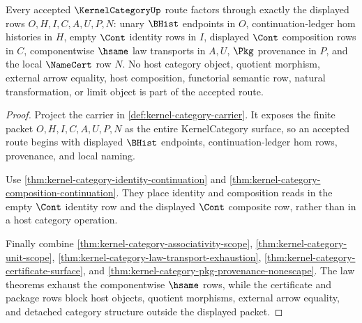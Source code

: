 \begin{theorem}
\label{thm:kernel-category-route-totality}
Every accepted $\KernelCategoryUp$ route factors through exactly the displayed rows $O,H,I,C,A,U,P,N$: unary $\BHist$ endpoints in $O$, continuation-ledger hom histories in $H$, empty $\Cont$ identity rows in $I$, displayed $\Cont$ composition rows in $C$, componentwise $\hsame$ law transports in $A,U$, $\Pkg$ provenance in $P$, and the local $\NameCert$ row $N$. No host category object, quotient morphism, external arrow equality, host composition, functorial semantic row, natural transformation, or limit object is part of the accepted route.
\end{theorem}
\begin{proof}
Project the carrier in \autoref{def:kernel-category-carrier}. It exposes the finite packet $O,H,I,C,A,U,P,N$ as the entire KernelCategory surface, so an accepted route begins with displayed $\BHist$ endpoints, continuation-ledger hom rows, provenance, and local naming.

Use \autoref{thm:kernel-category-identity-continuation} and \autoref{thm:kernel-category-composition-continuation}. They place identity and composition reads in the empty $\Cont$ identity row and the displayed $\Cont$ composite row, rather than in a host category operation.

Finally combine \autoref{thm:kernel-category-associativity-scope}, \autoref{thm:kernel-category-unit-scope}, \autoref{thm:kernel-category-law-transport-exhaustion}, \autoref{thm:kernel-category-certificate-surface}, and \autoref{thm:kernel-category-pkg-provenance-nonescape}. The law theorems exhaust the componentwise $\hsame$ rows, while the certificate and package rows block host objects, quotient morphisms, external arrow equality, and detached category structure outside the displayed packet.
\end{proof}


